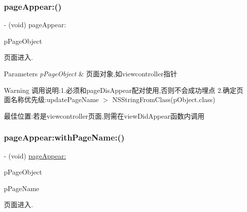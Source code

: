 \subsubsection{\texorpdfstring{page\+Appear\+:()}{pageAppear:()}}
{\footnotesize\ttfamily -\/ (void) page\+Appear\+: \begin{DoxyParamCaption}\item[{(id)}]{p\+Page\+Object }\end{DoxyParamCaption}}



页面进入. 


\begin{DoxyParams}{Parameters}
{\em p\+Page\+Object} & 页面对象,如viewcontroller指针\\
\hline
\end{DoxyParams}
\begin{DoxyWarning}{Warning}
调用说明\+:1.必须和page\+Dis\+Appear配对使用,否则不会成功埋点 2.确定页面名称优先级\+:update\+Page\+Name $>$ N\+S\+String\+From\+Class(p\+Object.\+class)
\end{DoxyWarning}
最佳位置\+:若是viewcontroller页面,则需在view\+Did\+Appear函数内调用 \mbox{\label{interface_u_t_tracker_a7875d1f7b785d1f2299a048e55b2971c}} 
\subsubsection{\texorpdfstring{page\+Appear\+:with\+Page\+Name\+:()}{pageAppear:withPageName:()}}
{\footnotesize\ttfamily -\/ (void) \mbox{\hyperlink{interface_u_t_tracker_a6381578aef02a4bc703738d142479a61}{page\+Appear\+:}} \begin{DoxyParamCaption}\item[{(id)}]{p\+Page\+Object }\item[{withPageName:(N\+S\+String $\ast$)}]{p\+Page\+Name }\end{DoxyParamCaption}}



页面进入. 


